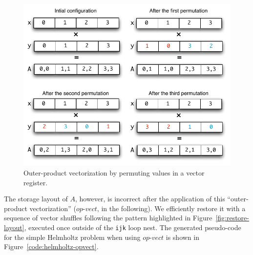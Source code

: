 \documentclass[conference]{IEEEtran}
\begin{document}

\begin{figure}[h]
\centerline{\includegraphics[scale=0.6]{Pictures/vect-by-vect.pdf}}
\caption{Outer-product vectorization by permuting values in a vector register.}
\label{fig:vect-by-vect}
\end{figure}

The storage layout of $A$, however, is incorrect after the application of this ``outer-product vectorization'' ($op$-$vect$, in the following). We efficiently restore it with a sequence of vector shuffles following the pattern highlighted in Figure~\ref{fig:restore-layout}, executed once outside of the \texttt{ijk} loop nest. The generated pseudo-code for the simple Helmholtz problem when using $op$-$vect$ is shown in Figure~\ref{code:helmholtz-opvect}.
\end{document}
